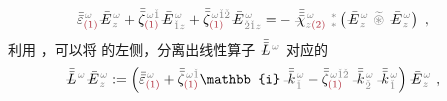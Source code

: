\begin{align} \label{eq:nonlinear(2)-wave_wkrho-simplify5-vector}
	\bar{\bar{\varepsilon}}^{\;\! \mathcolor{gray}{\omega}}_{\textcolor{Maroon}{(1)}} \Xint{\mathcolor{gray}{-}}{295}{\bar{E}}^{\;\!\mathcolor{gray}{\omega}}_{\;\! \mathcolor{gray}{z}} + \bar{\bar{\zeta}}^{\;\! \mathcolor{gray}{\omega} \mathcolor{gray}{\check{1}}}_{\textcolor{Maroon}{(1)}} \Xint{\mathcolor{gray}{-}}{295}{\bar{E}}^{\;\!\mathcolor{gray}{\omega}}_{\;\! \mathcolor{gray}{\check{1}} \mathcolor{gray}{z}} + \bar{\bar{\zeta}}^{\;\! \mathcolor{gray}{\omega} \mathcolor{gray}{\check{1} \check{2}}}_{\textcolor{Maroon}{(1)}} \Xint{\mathcolor{gray}{-}}{295}{\bar{E}}^{\;\!\mathcolor{gray}{\omega}}_{\;\! \mathcolor{gray}{\check{2} \check{1}} \mathcolor{gray}{z}}
	= &- \Xint{{}^{}_{\mathcolor{gray}{-}}}{23}{\bar{\bar{\bar{\chi}}}}^{\;\! \mathcolor{gray}{\omega}}_{\mathcolor{gray}{z} \textcolor{Maroon}{(2)}} ~{}^{\mathcolor{gray}{*}}_{\mathcolor{gray}{*}} \left( \Xint{\mathcolor{gray}{-}}{295}{\bar{E}}^{\;\!\mathcolor{gray}{\omega}}_{\;\! \mathcolor{gray}{z}} ~\mathcolor{gray}{\widetilde \circledast}~ \Xint{\mathcolor{gray}{-}}{295}{\bar{E}}^{\;\!\mathcolor{gray}{\omega}}_{\;\! \mathcolor{gray}{z}} \right) ~,
\end{align}
利用 ，可以将  的左侧，分离出线性算子 $\Xint{\mathcolor{gray}{-}}{30}{\bar{\bar{L}}}^{\;\! \mathcolor{gray}{\omega}}$ 对应的
\begin{align} \label{eq:matrix_exp_eq-left_L}
	\Xint{\mathcolor{gray}{-}}{32}{\bar{\bar{L}}}^{\;\! \mathcolor{gray}{\omega}} \Xint{\mathcolor{gray}{-}}{295}{\bar{E}}^{\;\!\mathcolor{gray}{\omega}}_{\;\! \mathcolor{gray}{z}} &:= \left( \bar{\bar{\varepsilon}}^{\;\! \mathcolor{gray}{\omega}}_{\textcolor{Maroon}{(1)}} + \bar{\bar{\zeta}}^{\;\! \mathcolor{gray}{\omega} \mathcolor{gray}{\check{1}}}_{\textcolor{Maroon}{(1)}} \mathbb{i} \Xint{\begin{smallmatrix} ~ \\ {}^{}_{\mathcolor{gray}{-}} \\ ~ \end{smallmatrix}}{15}{\bar{\bar{k}}}_{\;\! \mathcolor{gray}{\check{1}}}^{\;\! \mathcolor{gray}{\omega}} - \bar{\bar{\zeta}}^{\;\! \mathcolor{gray}{\omega} \mathcolor{gray}{\check{1} \check{2}}}_{\textcolor{Maroon}{(1)}} \Xint{\begin{smallmatrix} ~ \\ {}^{}_{\mathcolor{gray}{-}} \\ ~ \end{smallmatrix}}{15}{\bar{\bar{k}}}_{\;\! \mathcolor{gray}{\check{2}}}^{\;\! \mathcolor{gray}{\omega}} \Xint{\begin{smallmatrix} ~ \\ {}^{}_{\mathcolor{gray}{-}} \\ ~ \end{smallmatrix}}{15}{\bar{\bar{k}}}_{\;\! \mathcolor{gray}{\check{1}}}^{\;\! \mathcolor{gray}{\omega}} \right) \Xint{\mathcolor{gray}{-}}{295}{\bar{E}}^{\;\!\mathcolor{gray}{\omega}}_{\;\! \mathcolor{gray}{z}} ~,
\end{align}
